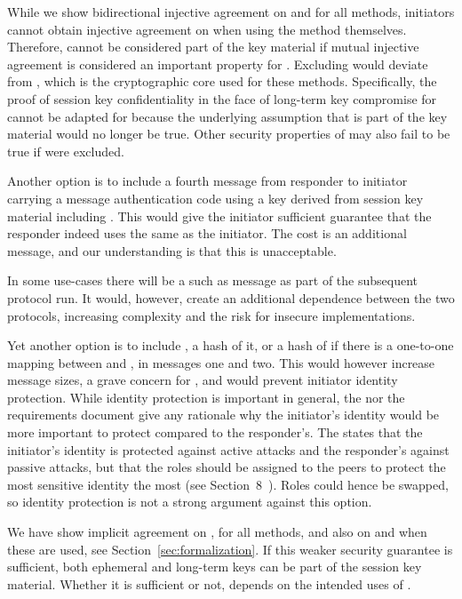 \documentclass[runningheads,draft,x11names]{llncs}
\begin{document}
While we show bidirectional injective agreement on \mGx{} and \mGy{}
for all methods, initiators cannot obtain injective agreement on \mGiy{} when
using the \mStat{} method themselves.
%
Therefore, \mGiy{} cannot be considered part of the key material if mutual
injective agreement is considered an important property for \mEdhoc{}.
%
Excluding \mGiy{} would deviate from \mOptls{}, which is the cryptographic core
used for these methods.
%
Specifically, the proof of session key confidentiality in the face of long-term
key compromise for \mOptls{} cannot be adapted for \mEdhoc{} because the
underlying assumption that \mGiy{} is part of the key material would no longer
be true.
%
Other security properties of \mOptls{} may also fail to be true if
\mGiy{} were excluded.
%

Another option is to include a fourth message from responder to initiator
carrying a message authentication code using a key derived from session key
material including \mGiy{}.
%
This would give the initiator sufficient guarantee that the responder indeed
uses the same \mGiy{} as the initiator.
%
The cost is an additional message, and our understanding is that this is
unacceptable. 
%

In some use-cases there will be a such as message as part of
the subsequent \mOscore{} protocol run.
%
It would, however, create an additional dependence between the two protocols,
increasing complexity and the risk for insecure implementations.
%

Yet another option is to include \mGi{}, a hash of it, or a hash of \mIdcredi{}
if there is a one-to-one mapping between \mIdcredi{} and \mGi{}, in messages one
and two.
%
This would however increase message sizes, a grave concern for \mEdhoc{}, and
would prevent initiator identity protection.
%
While identity protection is important in general, the \mSpec{} nor the
requirements document give any rationale why the initiator's identity would be
more important to protect compared to the responder's.
%
The \mSpec{} states that the
initiator's identity is protected against active attacks and the responder's
against passive attacks, but that the roles should be assigned to the \mCoap{}
peers to protect the most sensitive identity the most (see
Section~8~\cite{selander-lake-edhoc-01}).
%
Roles could hence be swapped, so identity protection is not a strong argument
against this option.
%

We have show implicit agreement on \mGx{}, \mGy{} for all methods, and also on
\mGiy{} and \mGrx{} when these are used, see Section~\ref{sec:formalization}.
%
If this weaker security guarantee is sufficient, both ephemeral and long-term
keys can be part of the session key material.
%
Whether it is sufficient or not, depends on the intended uses of \mEdhoc{}.
%
\end{document}
